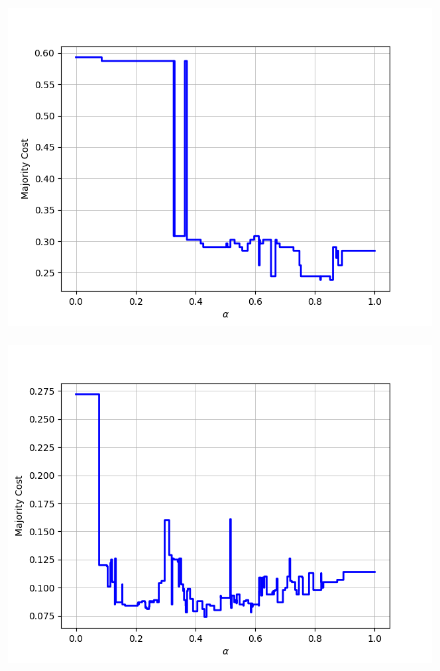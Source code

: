 \begin{figure}[h]
\begin{minipage}{.24\textwidth}
  {\includegraphics[width=\linewidth]{plots/nell-ac/mediacompany}}
\end{minipage}
\begin{minipage}{.24\textwidth}
  \centering
  {\includegraphics[width=\linewidth]{plots/nell-ac/organization}}
\end{minipage}
\begin{minipage}{.24\textwidth}
  \centering

\end{minipage}
\end{figure}
